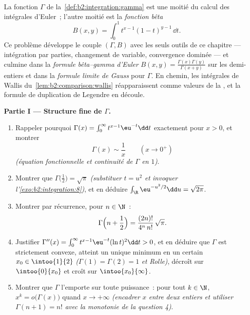\begin{problem}\label{pb:b2:integration:1}
La fonction $\Gamma$ de la~\cref{def:b2:integration:gamma} est une
moitié du calcul des intégrales d'Euler~; l'autre moitié est la
\emph{fonction bêta}
\[
B(x, y) = \int_0^1 t^{x-1}(1 - t)^{y-1}\,\dd t .
\]
Ce problème développe le couple $(\Gamma, B)$ avec les seuls outils de
ce chapitre --- intégration par parties, changement de variable,
convergence dominée --- et culmine dans la \emph{formule bêta--gamma
d'Euler} $B(x,y) = \frac{\Gamma(x)\Gamma(y)}
{\Gamma(x+y)}$ sur les demi-entiers et dans la \emph{formule limite de
Gauss} pour $\Gamma$. En chemin,
les intégrales de Wallis du~\cref{lem:b2:comparison:wallis}
réapparaissent comme valeurs de la , et la formule de
duplication de Legendre en découle.

\medskip
\noindent\textbf{Partie I --- Structure fine de $\Gamma$.}
\begin{enumerate}
  \item Rappeler pourquoi $\Gamma(x) = \int_0^\infty t^{x-1}\eu^{-t}\dd
        t$  exactement pour $x > 0$, et montrer
        \[
        \Gamma(x) \sim \frac1x \qquad (x \to 0^+)
        \]
        \emph{(équation fonctionnelle et continuité de $\Gamma$ en
        $1$)}.
  \item Montrer que $\Gamma\bigl(\tfrac12\bigr) = \sqrt\pi$
        \emph{(substituer $t = u^2$ et invoquer
        l'\cref{exo:b2:integration:8})}, et en déduire
        $\int_\R \eu^{-u^2/2}\dd u = \sqrt{2\pi}$.
  \item Montrer par récurrence, pour $n \in \N$~:
        \[
        \Gamma\Bigl(n + \frac12\Bigr)
        = \frac{(2n)!}{4^n\,n!}\,\sqrt\pi .
        \]
  \item Justifier $\Gamma''(x) = \int_0^\infty
        t^{x-1}\eu^{-t}(\ln t)^2\dd t > 0$, et en déduire que
        $\Gamma$ est strictement convexe, atteint un unique minimum en
        un certain $x_0 \in \intoo{1}{2}$ \emph{($\Gamma(1) = \Gamma(2)
        = 1$ et Rolle)}, décroît sur $\intoo{0}{x_0}$ et
        croît sur $\intoo{x_0}{\infty}$.
  \item Montrer que $\Gamma$ l'emporte sur toute puissance~: pour tout $k \in
        \N$, $x^k = o\bigl(\Gamma(x)\bigr)$ quand $x \to +\infty$
        \emph{(encadrer $x$ entre deux entiers et utiliser $\Gamma(n+1)
        = n!$ avec la monotonie de la question 4)}.
\end{enumerate}


\end{problem}

